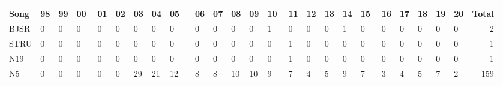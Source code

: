 \begin{longtable}{p{}p{}p{}p{}p{}p{}p{}p{}p{}p{}p{}p{}p{}p{}p{}p{}p{}p{}p{}p{}p{}p{}p{}p{}p{}p{}p{}p{}r}
\textbf{Song} & \textbf{98} & \textbf{99} & \multicolumn{2}{l}{\textbf{00}} & \textbf{01} & \textbf{02} & \textbf{03} & \textbf{04} & \multicolumn{2}{l}{\textbf{05}} & \textbf{06} & \textbf{07} & \textbf{08} & \textbf{09} & \multicolumn{2}{l}{\textbf{10}} & \textbf{11} & \textbf{12} & \textbf{13} & \textbf{14} & \multicolumn{2}{l}{\textbf{15}} & \textbf{16} & \textbf{17} & \textbf{18} & \textbf{19} & \textbf{20} & \textbf{Total} \\
\midrule
\endhead 
         BJSR &           0 &           0 &           0 &   &           0 &           0 &           0 &           0 &           0 &   &           0 &           0 &           0 &           0 &           1 &   &           0 &           0 &           0 &           1 &           0 &   &           0 &           0 &           0 &           0 &           0 &              2 \\
         STRU &           0 &           0 &           0 &   &           0 &           0 &           0 &           0 &           0 &   &           0 &           0 &           0 &           0 &           0 &   &           1 &           0 &           0 &           0 &           0 &   &           0 &           0 &           0 &           0 &           0 &              1 \\
          N19 &           0 &           0 &           0 &   &           0 &           0 &           0 &           0 &           0 &   &           0 &           0 &           0 &           0 &           0 &   &           1 &           0 &           0 &           0 &           0 &   &           0 &           0 &           0 &           0 &           0 &              1 \\
           N5 &           0 &           0 &           0 &   &           0 &           0 &          29 &          21 &          12 &   &           8 &           8 &          10 &          10 &           9 &   &           7 &           4 &           5 &           9 &           7 &   &           3 &           4 &           5 &           7 &           2 &            159 \\

\end{longtable}
